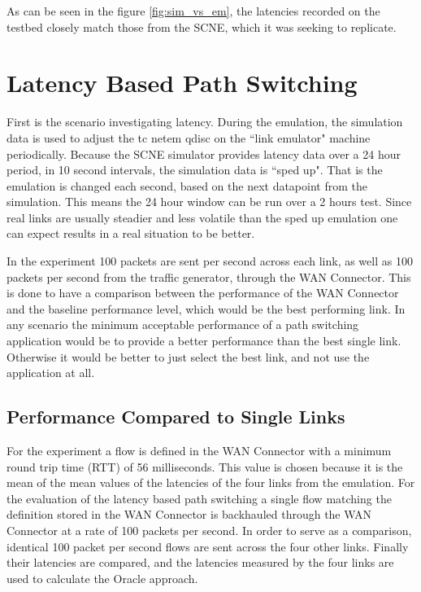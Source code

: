 As can be seen in the figure \ref{fig:sim_vs_em}, the latencies recorded on the testbed closely match those from the SCNE, which it was seeking to replicate.

\section{Latency Based Path Switching}

First is the scenario investigating latency. During the emulation, the simulation data is used to adjust the tc netem qdisc on the “link emulator" machine periodically. Because the SCNE simulator provides latency data over a 24 hour period, in 10 second intervals, the simulation data is “sped up". That is the emulation is changed each second, based on the next datapoint from the simulation. This means the 24 hour window can be run over a 2 hours test. Since real links are usually steadier and less volatile than the sped up emulation one can expect results in a real situation to be better.

In the experiment 100 packets are sent per second across each link, as well as 100 packets per second from the traffic generator, through the WAN Connector. This is done to have a comparison between the performance of the WAN Connector and the baseline performance level, which would be the best performing link. In any scenario the minimum acceptable performance of a path switching application would be to provide a better performance than the best single link. Otherwise it would be better to just select the best link, and not use the application at all.


\subsection{Performance Compared to Single Links}

For the experiment a flow is defined in the WAN Connector with a minimum round trip time (RTT) of 56 milliseconds. This value is chosen because it is the mean of the mean values of the latencies of the four links from the emulation. For the evaluation of the latency based path switching a single flow matching the definition stored in the WAN Connector is backhauled through the WAN Connector at a rate of 100 packets per second. In order to serve as a comparison, identical 100 packet per second flows are sent across the four other links. Finally their latencies are compared, and the latencies measured by the four links are used to calculate the Oracle approach.

